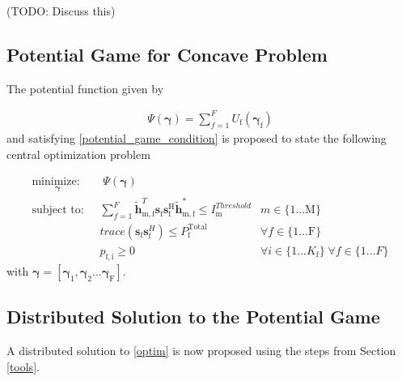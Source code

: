 \documentclass[12pt,a4paper]{report}
\begin{document}
(TODO: Discuss this)

\subsection{Potential Game for Concave Problem}

The potential function given by 

\begin{gather*} \label{Potential_Function}
\Psi(\mathbf{\boldsymbol{\gamma}}) = \sum_{f = 1}^{F} U_{\text{f}}(\mathbf{\boldsymbol{\gamma}_{\mathrm{f}}})
\end{gather*}
and 
satisfying \eqref{potential_game_condition} is proposed to state the following central optimization problem
	
		\begin{subequations}
	\label{optim}
	\begin{align}
	    \underset{\mathbf{\gamma}}{\text{minimize: }}
	    & \; \Psi(\mathbf{\gamma}) \label{potential_game} \\
	    \text{subject to: } \; &
	  \sum^F_{f=1} \mathbf{\tilde{h}}_{\mathrm{m,f}}^T  \mathbf{s}_{\mathrm{f}} 						
	\mathbf{s_{\mathrm{f}}^{\mathrm{H}}} \mathbf{\tilde{h}_{\mathrm{m,f}}^*} \leq I^{Threshold}		
	_{\mathrm{m}} & m \in \{1 ...\text{M}\} 
		\label{interference_const}\\
        & trace(\mathbf{s}_\mathrm{f}\mathbf{s}_\mathrm{f}^H)  \leq P_{\mathrm{f}}^{\text{Total}}  \label{power_const}
        & \forall f \in \{1 ... \text{F}\}\\
        & p_{\mathrm{f,i}} \geq 0 &  \forall i \in \{1 ...K_{\mathrm{f}}\} \; \forall f \in \{1 ... F\}\label{pos_power_const}
	\end{align}
	\end{subequations}
	with $\mathbf{\gamma}= [\mathbf{\gamma_{\mathrm{1}}},\mathbf{\gamma_{\mathrm{2}}}...\mathbf{\gamma_{\mathrm{F}}}]$.


\subsection{Distributed Solution to the Potential Game}
A distributed solution to \eqref{optim} is now proposed using the steps from Section \ref{tools}.
\end{document}
